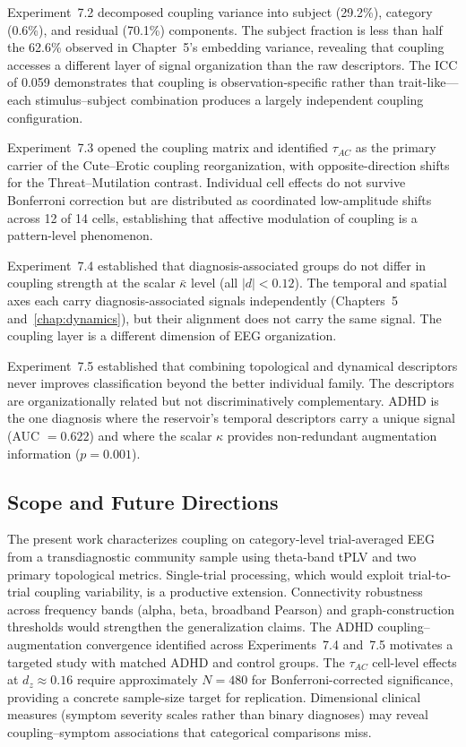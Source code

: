 Experiment~7.2 decomposed coupling variance into subject (29.2\%), category (0.6\%), and residual (70.1\%) components. The subject fraction is less than half the 62.6\% observed in Chapter~5's embedding variance, revealing that coupling accesses a different layer of signal organization than the raw descriptors. The ICC of 0.059 demonstrates that coupling is observation-specific rather than trait-like---each stimulus--subject combination produces a largely independent coupling configuration.

Experiment~7.3 opened the coupling matrix and identified $\tau_{AC}$ as the primary carrier of the Cute--Erotic coupling reorganization, with opposite-direction shifts for the Threat--Mutilation contrast. Individual cell effects do not survive Bonferroni correction but are distributed as coordinated low-amplitude shifts across 12 of 14 cells, establishing that affective modulation of coupling is a pattern-level phenomenon.

Experiment~7.4 established that diagnosis-associated groups do not differ in coupling strength at the scalar $\bar{\kappa}$ level (all $|d| < 0.12$). The temporal and spatial axes each carry diagnosis-associated signals independently (Chapters~5 and~\ref{chap:dynamics}), but their alignment does not carry the same signal. The coupling layer is a different dimension of EEG organization.

Experiment~7.5 established that combining topological and dynamical descriptors never improves classification beyond the better individual family. The descriptors are organizationally related but not discriminatively complementary. ADHD is the one diagnosis where the reservoir's temporal descriptors carry a unique signal (AUC $= 0.622$) and where the scalar $\kappa$ provides non-redundant augmentation information ($p = 0.001$).

\subsection{Scope and Future Directions}

The present work characterizes coupling on category-level trial-averaged EEG from a transdiagnostic community sample using theta-band tPLV and two primary topological metrics. Single-trial processing, which would exploit trial-to-trial coupling variability, is a productive extension. Connectivity robustness across frequency bands (alpha, beta, broadband Pearson) and graph-construction thresholds would strengthen the generalization claims. The ADHD coupling--augmentation convergence identified across Experiments~7.4 and~7.5 motivates a targeted study with matched ADHD and control groups. The $\tau_{AC}$ cell-level effects at $d_z \approx 0.16$ require approximately $N = 480$ for Bonferroni-corrected significance, providing a concrete sample-size target for replication. Dimensional clinical measures (symptom severity scales rather than binary diagnoses) may reveal coupling--symptom associations that categorical comparisons miss.
